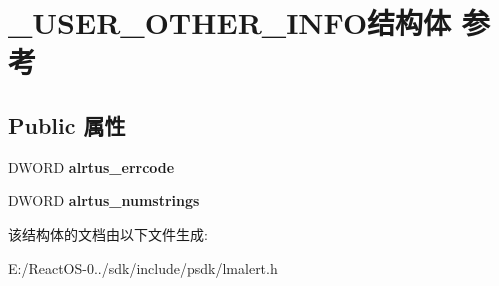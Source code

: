 \hypertarget{struct___u_s_e_r___o_t_h_e_r___i_n_f_o}{}\section{\+\_\+\+U\+S\+E\+R\+\_\+\+O\+T\+H\+E\+R\+\_\+\+I\+N\+F\+O结构体 参考}
\label{struct___u_s_e_r___o_t_h_e_r___i_n_f_o}
\subsection*{Public 属性}
\begin{DoxyCompactItemize}
\item 
\mbox{\label{struct___u_s_e_r___o_t_h_e_r___i_n_f_o_a7f88820298868677c71b9d8741034eb4}} 
D\+W\+O\+RD {\bfseries alrtus\+\_\+errcode}
\item 
\mbox{\label{struct___u_s_e_r___o_t_h_e_r___i_n_f_o_a6dafeafd2b6e79fece8ccceddafac1c2}} 
D\+W\+O\+RD {\bfseries alrtus\+\_\+numstrings}
\end{DoxyCompactItemize}


该结构体的文档由以下文件生成\+:\begin{DoxyCompactItemize}
\item 
E\+:/\+React\+O\+S-\/0../sdk/include/psdk/lmalert.\+h\end{DoxyCompactItemize}

